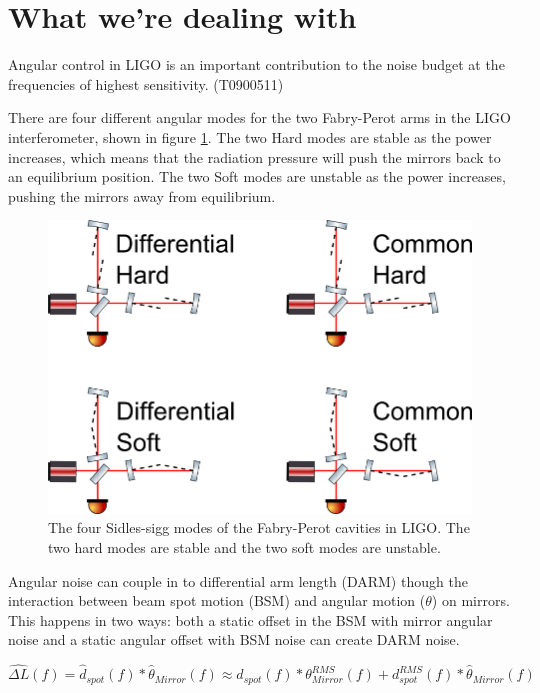 \section{What we're dealing with}
Angular control in LIGO is an important contribution to the noise budget at the frequencies of highest sensitivity. (T0900511)

There are four different angular modes for the two Fabry-Perot arms in the LIGO interferometer, shown in figure \ref{fig:sidlessiggmodes}. 
The two Hard modes are stable as the power increases, which means that the radiation pressure will push the mirrors back to an equilibrium position.
The two Soft modes are unstable as the power increases, pushing the mirrors away from equilibrium.

\begin{figure}[htp]%
\includegraphics[width=.8\textwidth]{figures/application/SidlesSigg}%
\caption[Sidles-Sigg Modes]{The four Sidles-sigg modes of the Fabry-Perot cavities in LIGO. The two hard modes are stable and the two soft modes are unstable.}%
\label{fig:sidlessiggmodes}%
\end{figure}

Angular noise can couple in to differential arm length (DARM) though the interaction between beam spot motion (BSM) and angular motion ($\theta$) on mirrors. This happens in two ways: both a static offset in the BSM with mirror angular noise and a static angular offset with BSM noise can create DARM noise. 

\begin{equation}
\hat{\Delta L}(f) = \hat{d}_{spot}(f)*\hat{\theta}_{Mirror}(f) \approx \hat{d}_{spot}(f)*\theta_{Mirror}^{RMS}(f) + d_{spot}^{RMS}(f)*\hat{\theta}_{Mirror}(f)
\label{eq:darmcouple}
\end{equation}

